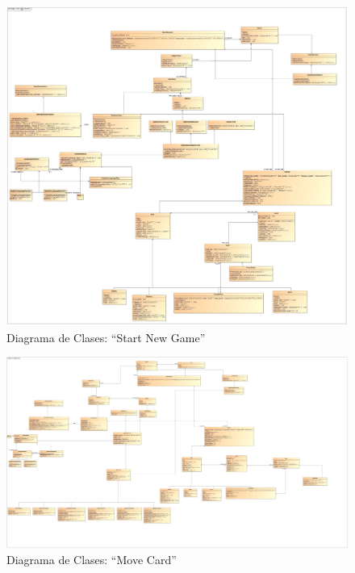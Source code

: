 \documentclass[11pt]{article}
\begin{document}
\begin{landscape}
\begin{center}
 \begin{figure}[H]
 \begin{center}
 \includegraphics[scale=0.22]{Analysis/ResetGame00.jpg}
   \caption{Diagrama de Clases: ``Start New Game''}
   \label{fig:resetgame}
 \end{center}
 \end{figure}
\end{center}
\end{landscape}
\restoregeometry

\begin{landscape}
\begin{center}
 \begin{figure}[H]
 \begin{center}
 \includegraphics[scale=0.18]{Analysis/MoveCard00.jpg}
   \caption{Diagrama de Clases: ``Move Card''}
   \label{fig:movecard}
 \end{center}
 \end{figure}
\end{center}
\end{landscape}
\restoregeometry
\end{document}
